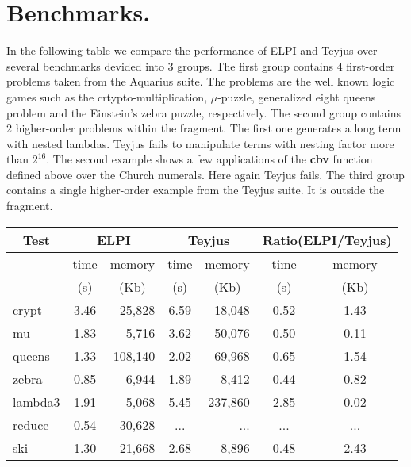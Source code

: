 \documentclass{llncs}
\begin{document}
\section{Benchmarks.}\label{sec:benchmarks}



In the following table we compare the performance of ELPI and Teyjus over several benchmarks 
devided into 3 groups. 
The first group contains 4 first-order problems taken from the Aquarius suite. The problems 
are the well known logic games such as the crtypto-multiplication, $\mu$-puzzle, 
generalized eight queens problem and the Einstein's zebra puzzle, respectively. The second group contains 
2 higher-order problems within the fragment. The first one generates a long term with nested 
lambdas. Teyjus fails to manipulate terms with nesting factor more than $2^16$. The second 
example shows a few applications of the {\bf cbv} function defined above over the 
Church numerals. Here again Teyjus fails. The third group contains a single higher-order 
example from the Teyjus suite. It is outside the fragment. 

\begin{center}

  \begin{tabular}{|p{1.5cm}||c|r||c|r||c|c|}
    \hline
      \multicolumn{1}{|c||}{Test} &
      \multicolumn{2}{|c||}{ELPI} &
      \multicolumn{2}{|c||}{Teyjus} &
      \multicolumn{2}{|c|}{Ratio(ELPI/Teyjus)} \\
    \hline
      &  time     & memory  & time & memory &  time & memory \\
    
      &  \multicolumn{1}{c|}{(s)}  & \multicolumn{1}{c||}{(Kb)} & \multicolumn{1}{c|}{(s)}  & \multicolumn{1}{c||}{(Kb)} & \multicolumn{1}{c|}{(s)}  & \multicolumn{1}{c|}{(Kb)} \\
    \hline
    \hline
    crypt &  3.46 & 25,828  & 6.59 & 18,048 &  0.52 & 1.43 \\
    \hline    
    mu &  1.83 & 5,716 &  3.62 & 50,076 &  0.50 & 0.11 \\
    \hline
    queens &  1.33  & 108,140 &  2.02 & 69,968 &  0.65 & 1.54 \\
    \hline    
    zebra &  0.85 & 6,944 &  1.89 & 8,412 &  0.44 & 0.82 \\
    \hline     
    \hline
    lambda3 &  1.91 & 5,068 &  5.45 & 237,860 &  2.85 & 0.02 \\
    \hline
    reduce &  0.54 & 30,628 &   ... & ...   & ... & ... \\
    \hline
    \hline
    ski &  1.30 & 21,668 &  2.68 & 8,896  & 0.48 & 2.43 \\
    \hline
    
  \end{tabular}

 \end{center}



 
 


\end{document}
